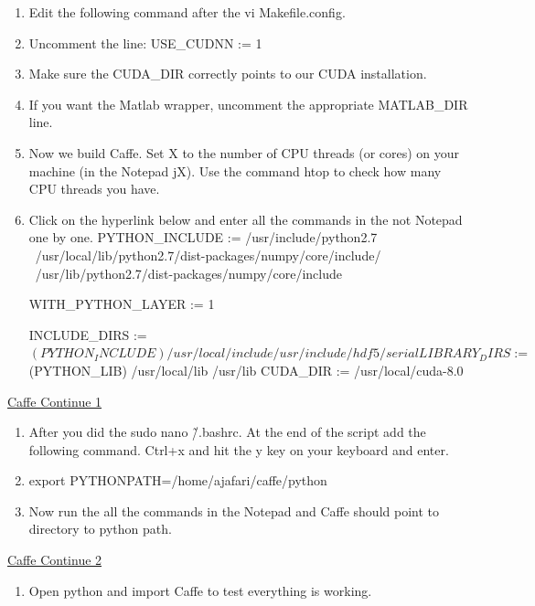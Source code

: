 \documentclass[12pt]{article}
\begin{document}
\begin{enumerate}[resume]
  \item Edit the following command after the vi Makefile.config.
  \item Uncomment the line: USE\_CUDNN := 1
  \item Make sure the CUDA\_DIR correctly points to our CUDA installation.
  \item If you want the Matlab wrapper, uncomment the appropriate MATLAB\_DIR line.
  \item Now we build Caffe. Set X to the number of CPU threads (or cores) on your machine (in the Notepad jX). Use the command htop to check how many CPU threads you have.
  \item Click on the hyperlink below and enter all the commands in the not Notepad one by one.
  PYTHON_INCLUDE := /usr/include/python2.7 \
/usr/local/lib/python2.7/dist-packages/numpy/core/include/ \
                /usr/lib/python2.7/dist-packages/numpy/core/include
                
                WITH_PYTHON_LAYER := 1
                
                INCLUDE_DIRS := $(PYTHON_INCLUDE) /usr/local/include /usr/include/hdf5/serial
LIBRARY_DIRS := $(PYTHON_LIB) /usr/local/lib /usr/lib
CUDA_DIR := /usr/local/cuda-8.0

\end{enumerate}

\begin{center}
\href{run:./Text_Files_16/Caffe1.txt}{\Large Caffe Continue 1}
\end{center}

\begin{enumerate}[resume]
   \item After you did the sudo nano \~/.bashrc. At the end of the script add the following command. Ctrl+x and hit the y key on your keyboard and enter.
   \item export PYTHONPATH=/home/ajafari/caffe/python
   \item Now run the all the commands in the Notepad and Caffe should point to directory to python path.
\end{enumerate}

\begin{center}
\href{run:./Text_Files_16/Caffe2.txt}{\Large Caffe Continue 2}
\end{center}

\begin{enumerate}[resume]
   \item Open python and import Caffe to test everything is working.
\end{enumerate}
\end{document}
